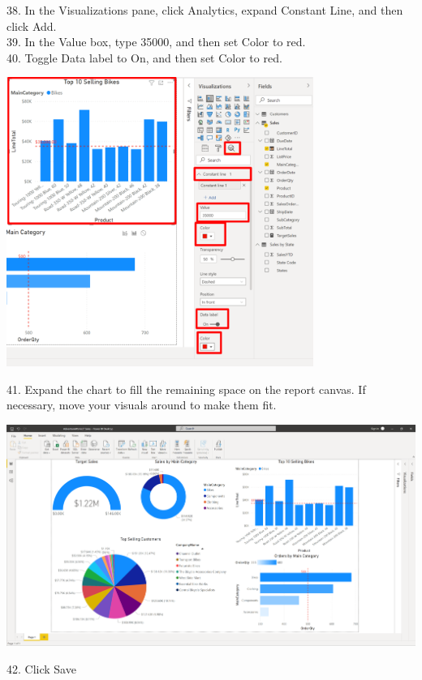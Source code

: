 \documentclass[12pt,letterpaper]{article}
\begin{document}
38. In the Visualizations pane, click Analytics, expand Constant Line, and then click Add.
\\39. In the Value box, type 35000, and then set Color to red.
\\40. Toggle Data label to On, and then set Color to red.
\begin{center}
    \includegraphics[width=10cm]{img/99.png}
    \vspace{1cm}
\end{center}
41. Expand the chart to fill the remaining space on the report canvas. If necessary, move your visuals
around to make them fit.
\begin{center}
    \includegraphics[width=17cm]{img/100.png}
\end{center}
42. Click Save
\end{document}
